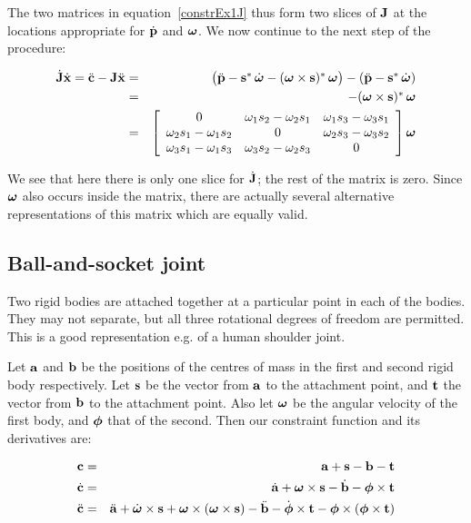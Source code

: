 The two matrices in equation~\ref{constrEx1J} thus form two slices of $\m{J}$ at
the locations appropriate for $\dot{\ve{p}}$ and $\ve{\omega}$. We now continue to the
next step of the procedure:

\begin{eqnarray}
\dot{\m{J}}\dot{\ve{x}} = 
\ddot{\ve{c}} - \m{J}\ddot{\ve{x}} &=&
    \big(\ddot{\ve{p}} - \dual{\ve{s}}\,\dot{\ve{\omega}} -
    \dual{(\ve{\omega}\times\ve{s})}\,\ve{\omega}\big) -
    (\ddot{\ve{p}} - \dual{\ve{s}}\,\dot{\ve{\omega}}) \nonumber\\
& = & -\dual{(\ve{\omega}\times\ve{s})}\,\ve{\omega} \nonumber\\
& = & \left[\begin{array}{ccc} 0 &
    \omega_1 s_2 - \omega_2 s_1 &
    \omega_1 s_3 - \omega_3 s_1 \\
    \omega_2 s_1 - \omega_1 s_2 & 0 &
    \omega_2 s_3 - \omega_3 s_2 \\
    \omega_3 s_1 - \omega_1 s_3 &
    \omega_3 s_2 - \omega_2 s_3 & 0
    \end{array}\right] \ve{\omega} \nonumber\\\label{constrEx1JDot}
\end{eqnarray}

We see that here there is only one slice for $\dot{\m{J}}$; the rest of the matrix
is zero. Since $\ve{\omega}$ also occurs inside the matrix, there are actually several
alternative representations of this matrix which are equally valid.

\subsection{Ball-and-socket joint}

Two rigid bodies are attached together at a particular point in each of the bodies.
They may not separate, but all three rotational degrees of freedom are permitted. This is
a good representation e.g. of a human shoulder joint.

Let $\ve{a}$ and $\ve{b}$ be the positions of the centres of mass in the first and
second rigid body respectively. Let $\ve{s}$ be the vector from $\ve{a}$ to the 
attachment point, and $\ve{t}$ the vector from $\ve{b}$ to the attachment point.
Also let $\ve{\omega}$ be the angular velocity of the first body, and $\ve{\phi}$ that
of the second. Then our constraint function and its derivatives are:

\begin{eqnarray}
\ve{c} &=& \ve{a} + \ve{s} - \ve{b} - \ve{t} \\
\dot{\ve{c}} &=& \dot{\ve{a}} + \ve{\omega}\times\ve{s} -
    \dot{\ve{b}} - \ve{\phi}\times\ve{t} \\
\ddot{\ve{c}} &=& \ddot{\ve{a}} + \dot{\ve{\omega}}\times\ve{s} +
    \ve{\omega}\times(\ve{\omega}\times\ve{s}) -
    \ddot{\ve{b}} - \dot{\ve{\phi}}\times\ve{t} -
    \ve{\phi}\times(\ve{\phi}\times\ve{t})
\end{eqnarray}

